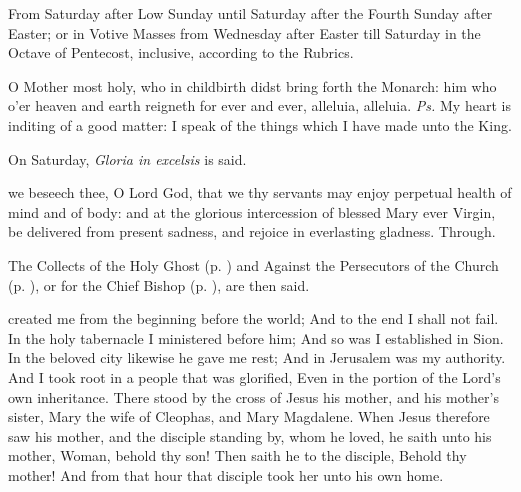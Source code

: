 \begin{rubric}
    {From Saturday after Low Sunday until Saturday after the Fourth Sunday after Easter; or in Votive Masses from Wednesday after Easter till Saturday in the Octave of Pentecost, inclusive, according to the Rubrics.}
\end{rubric}
\introit
{} O Mother most holy, who in childbirth didst bring forth the Monarch: him who o'er heaven and earth reigneth for ever and ever, alleluia, alleluia. \textit{Ps.} My heart is inditing of a good matter: I speak of the things which I have made unto the King.
\begin{rubric}
    On Saturday, \emph{Gloria in excelsis} is said.
\end{rubric}
\collect
{} we beseech thee, O Lord God, that we thy servants may enjoy perpetual health of mind and of body: and at the glorious intercession of blessed Mary ever Virgin, be delivered from present sadness, and rejoice in everlasting gladness. Through.
\begin{rubric}
    The Collects of the Holy Ghost (p. \pageref{SPHolyGhost}) and Against the Persecutors of the Church (p. \pageref{SPAgainst}), or for the Chief Bishop (p. \pageref{SPChiefBishop}), are then said.
\end{rubric}
 created me from the beginning before the world; And to the end I shall not fail. In the holy tabernacle I ministered before him; And so was I established in Sion. In the beloved city likewise he gave me rest; And in Jerusalem was my authority. And I took root in a people that was glorified, Even in the portion of the Lord’s own inheritance.
 There stood by the cross of Jesus his mother, and his mother's sister, Mary the wife of Cleophas, and Mary Magdalene. When Jesus therefore saw his mother, and the disciple standing by, whom he loved, he saith unto his mother, Woman, behold thy son! Then saith he to the disciple, Behold thy mother! And from that hour that disciple took her unto his own home.
